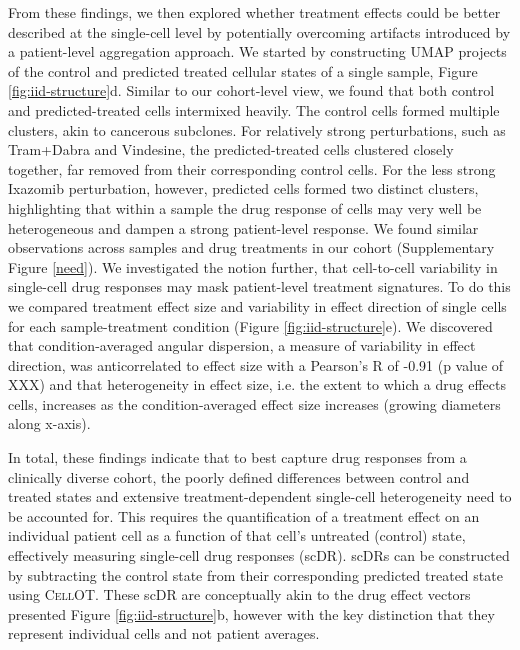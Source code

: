From these findings, we then explored whether treatment effects could be better described at the single-cell level by potentially overcoming artifacts introduced by a patient-level aggregation approach.
 We started by constructing UMAP projects of the control and predicted treated cellular states of a single sample, Figure \ref{fig:iid-structure}d.
 Similar to our cohort-level view, we found that both control and predicted-treated cells intermixed heavily.
 The control cells formed multiple clusters, akin to cancerous subclones.
 For relatively strong perturbations, such as Tram+Dabra and Vindesine, the predicted-treated cells clustered closely together, far removed from their corresponding control cells.
 For the less strong Ixazomib perturbation, however, predicted cells formed two distinct clusters, highlighting that within a sample the drug response of cells may very well be heterogeneous and dampen a strong patient-level response.
 We found similar observations across samples and drug treatments in our cohort (Supplementary Figure \ref{need}).
 We investigated the notion further, that cell-to-cell variability in single-cell drug responses may mask patient-level treatment signatures.
 To do this we compared treatment effect size and variability in effect direction of single cells for each sample-treatment condition (Figure \ref{fig:iid-structure}e).
 We discovered that condition-averaged angular dispersion, a measure of variability in effect direction, was anticorrelated to effect size with a Pearson’s R of -0.91 (p value of XXX) %
 and that heterogeneity in effect size, i.e. the extent to which a drug effects cells, increases as the condition-averaged effect size increases (growing diameters along x-axis). 

In total, these findings indicate that to best capture drug responses from a clinically diverse cohort, the poorly defined differences between control and treated states and extensive treatment-dependent single-cell heterogeneity need to be accounted for.
 This requires the quantification of a treatment effect on an individual patient cell as a function of that cell’s untreated (control) state, effectively measuring single-cell drug responses (scDR).
 scDRs can be constructed by subtracting the control state from their corresponding predicted treated state using \textsc{CellOT}.
These scDR are conceptually akin to the drug effect vectors presented Figure \ref{fig:iid-structure}b, however with the key distinction that they represent individual cells and not patient averages.

